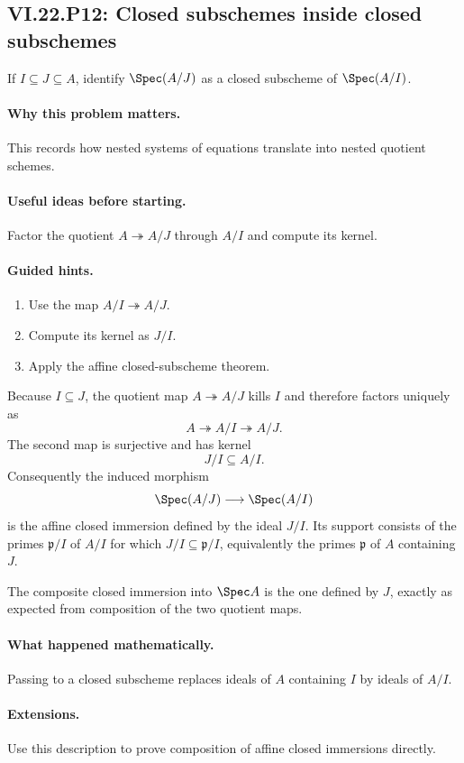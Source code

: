 \subsection*{VI.22.P12: Closed subschemes inside closed subschemes}
\begin{problem}\label{prob:vi22-p12}
If $I\subseteq J\subseteq A$, identify $\Spec(A/J)$ as a closed subscheme of $\Spec(A/I)$.
\end{problem}

\ifdefined\FullProblemDossiers
\paragraph{Why this problem matters.}
This records how nested systems of equations translate into nested quotient schemes.

\paragraph{Useful ideas before starting.}
Factor the quotient $A\twoheadrightarrow A/J$ through $A/I$ and compute its kernel.

\paragraph{Guided hints.}
\begin{enumerate}
\item Use the map $A/I\twoheadrightarrow A/J$.
\item Compute its kernel as $J/I$.
\item Apply the affine closed-subscheme theorem.
\end{enumerate}

\begin{solution}
Because $I\subseteq J$, the quotient map $A\twoheadrightarrow A/J$ kills $I$
and therefore factors uniquely as
\[
 A\twoheadrightarrow A/I\twoheadrightarrow A/J.
\]
The second map is surjective and has kernel
\[
 J/I\subseteq A/I.
\]
Consequently the induced morphism
\[
 \Spec(A/J)\longrightarrow\Spec(A/I)
\]
is the affine closed immersion defined by the ideal $J/I$.  Its support consists of the primes
$\mathfrak p/I$ of $A/I$ for which $J/I\subseteq\mathfrak p/I$, equivalently the primes
$\mathfrak p$ of $A$ containing $J$.

The composite closed immersion into $\Spec A$ is the one defined by $J$, exactly as expected
from composition of the two quotient maps.
\end{solution}

\paragraph{What happened mathematically.}
Passing to a closed subscheme replaces ideals of $A$ containing $I$ by ideals of $A/I$.

\paragraph{Extensions.}
Use this description to prove composition of affine closed immersions directly.
\fi
